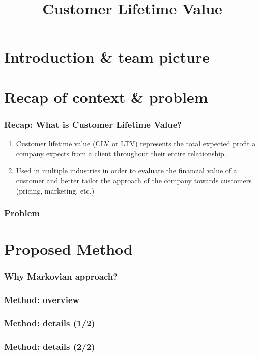\documentclass[aspectratio=169,xcolor=x11names,compress]{beamer}
\title{Customer Lifetime Value}
\author{}
\institute{}
\date{}
\begin{document}
\maketitle

\section{Introduction \& team picture}

\section{Recap of context \& problem}

\begin{frame}
\frametitle{Recap: What is Customer Lifetime Value?}

\begin{enumerate}
    \item Customer lifetime value (CLV or LTV) represents the total expected profit a
    company expects from a client throughout their entire relationship. \pause
    \item Used in multiple industries in order to evaluate the financial value of a
    customer and better tailor the approach of the company towards
    customers (pricing, marketing, etc.) 
\end{enumerate}

\end{frame}

\begin{frame}
\frametitle{Problem}
\end{frame}

\section{Proposed Method}

\begin{frame}
\frametitle{Why Markovian approach?}
\end{frame}

\begin{frame}
\frametitle{Method: overview}
\end{frame}

\begin{frame}
\frametitle{Method: details (1/2)}
\end{frame}

\begin{frame}
\frametitle{Method: details (2/2)}
\end{frame}
\end{document}
